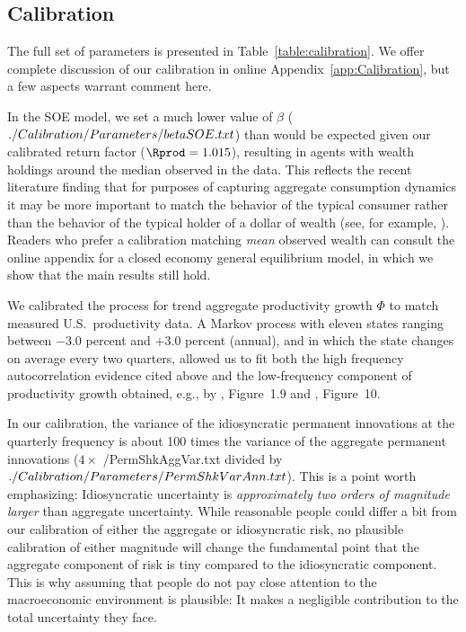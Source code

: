 \documentclass[titlepage]{\econtex}
\begin{document}
\subsection{Calibration}\label{sec:calibration}

The full set of parameters is presented in Table~\ref{table:calibration}.  We offer complete discussion of our calibration in online Appendix~\ref{app:Calibration}, but a few aspects warrant comment here.

In the SOE model, we set a much lower value of $\beta$ ($  ./Calibration/Parameters/betaSOE.txt $) than would be expected given our calibrated return factor (${\Rprod} = 1.015$), resulting in agents with wealth holdings around the median observed in the data.  This reflects the recent literature finding that for purposes of capturing aggregate consumption dynamics it may be more important to match the behavior of the typical consumer rather than the behavior of the typical holder of a dollar of wealth (see, for example, \cite{opLiquidH2M}).  Readers who prefer a calibration matching \textit{mean} observed wealth can consult the online appendix for a closed economy general equilibrium model, in which we show that the main results still hold.

We calibrated the process for trend aggregate productivity growth $\Phi$ to match measured U.S.\ productivity data.  A Markov process with eleven states ranging between $-3.0$ percent and $+3.0$ percent (annual), and in which the state changes on average every two quarters, allowed us to fit both the high frequency autocorrelation evidence cited above and the low-frequency component of productivity growth obtained, e.g., by \cite{sswNAIRU}, Figure~1.9 and \cite{fernald:disappointingRecovery}, Figure~10.

In our calibration, the variance of the idiosyncratic permanent innovations at the quarterly frequency is about 100 times the variance of the aggregate permanent innovations ($4 \times $ \ParmDir/PermShkAggVar.txt divided by $ ./Calibration/Parameters/PermShkVarAnn.txt $).  This is a point worth emphasizing: Idiosyncratic uncertainty is {\it approximately two orders of magnitude larger} than aggregate uncertainty.  While reasonable people could differ a bit from our calibration of either the aggregate or idiosyncratic risk, no plausible calibration of either magnitude will change the fundamental point that the aggregate component of risk is tiny compared to the idiosyncratic component.  This is why assuming that people do not pay close attention to the macroeconomic environment is plausible: It makes a negligible contribution to the total uncertainty they face.
\end{document}
